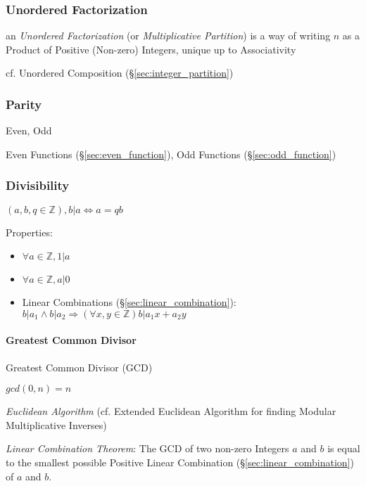 \subsubsection{Unordered Factorization}\label{sec:unordered_factorization}

an \emph{Unordered Factorization} (or \emph{Multiplicative Partition}) is a way
of writing $n$ as a Product of Positive (Non-zero) Integers, unique up to
Associativity

cf. Unordered Composition (\S\ref{sec:integer_partition})



\subsubsection{Parity}\label{sec:parity}

Even, Odd

\fist Even Functions (\S\ref{sec:even_function}), Odd Functions
(\S\ref{sec:odd_function})



\subsubsection{Divisibility}\label{sec:divisibility}

$(a,b,q \in \mathbb{Z}), b|a \Leftrightarrow a = qb$

Properties:

\begin{itemize}
\item $\forall a \in \mathbb{Z}, 1|a$
\item $\forall a \in \mathbb{Z}, a|0$
\item Linear Combinations (\S\ref{sec:linear_combination}): $b|a_1
  \wedge b|a_2 \Rightarrow (\forall x,y \in \mathbb{Z})b|a_1 x + a_2
  y$
\end{itemize}



\paragraph{Greatest Common Divisor}\label{sec:gcd}\hfill

Greatest Common Divisor (GCD)

$gcd(0,n) = n$

\emph{Euclidean Algorithm} (cf. Extended Euclidean Algorithm for finding Modular
Multiplicative Inverses)

\emph{Linear Combination Theorem}: The GCD of two non-zero Integers
$a$ and $b$ is equal to the smallest possible Positive Linear
Combination (\S\ref{sec:linear_combination}) of $a$ and $b$.

